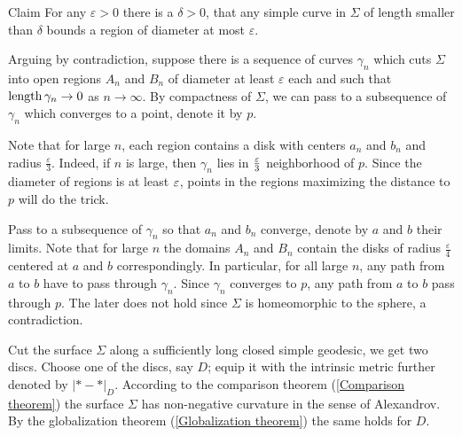 \documentclass[oneside,a4paper, 12pt]{article}
\begin{document}
\begin{thm}{Claim}\label{Lemma:diameter-perimeter}
For any $\varepsilon>0$ there is a $\delta>0$, that any simple curve in $\Sigma$ of length smaller than $\delta$ bounds a region of diameter at most $\varepsilon$.
\end{thm}

Arguing by contradiction, suppose there is a sequence of curves $\gamma_n$ which cuts $\Sigma$ into open regions $A_n$ and $B_n$ of diameter at least $\varepsilon$ each and such that $\mathop{\rm length}\nolimits\gamma_n\to 0$ as $n\to\infty$. 
By compactness of $\Sigma$,
we can pass to a subsequence of $\gamma_n$ which converges to a point, denote it by $p$. 

Note that for large $n$, each region contains a disk with centers $a_n$ and $b_n$ and radius $\tfrac\varepsilon3$. 
Indeed, if $n$ is large, then $\gamma_n$ lies in $\tfrac{\varepsilon}3$ neighborhood of $p$.
Since the diameter of regions is at least $\varepsilon$, points in the regions maximizing the distance to $p$ will do the trick.

Pass to a subsequence of $\gamma_n$ so that $a_n$ and $b_n$ converge, denote by $a$ and $b$ their limits.
Note that for large $n$ the domains $A_n$ and $B_n$ contain the disks of radius $\tfrac\varepsilon4$ centered at $a$ and $b$ correspondingly.
In particular, for all large $n$, any path from $a$ to $b$ have to pass through $\gamma_n$.
Since $\gamma_n$ converges to $p$, any path from $a$ to $b$ pass through $p$.
The later does not hold since $\Sigma$ is homeomorphic to the sphere, a contradiction.	
\qeds


Cut the surface $\Sigma$ along a sufficiently long closed simple geodesic,
we get two discs.
Choose one of the discs, say $D$;
equip it with the intrinsic metric further denoted by $|{*}-{*}|_D$.
According to the comparison theorem (\ref{Comparison theorem}) the surface $\Sigma$ has non-negative curvature in the sense of Alexandrov.
By the globalization theorem (\ref{Globalization theorem}) the same holds for $D$.
\end{document}

